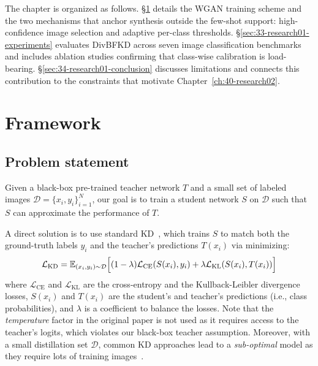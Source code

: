 \documentclass[12pt, a4paper, twoside]{book}
\numberwithin{equation}{chapter}
\theoremstyle{plain}
\theoremstyle{definition}
\theoremstyle{remark}
\newenvironment{foldable}{}{}
\newcommand*{\ie}{i.e.}
\begin{document}
\begin{foldable}
  The chapter is organized as follows.
  \S\ref{sec:32-research01-framework} details the WGAN training scheme and the two mechanisms that anchor synthesis outside the few-shot support: high-confidence image selection and adaptive per-class thresholds.
  \S\ref{sec:33-research01-experiments} evaluates DivBFKD across seven image classification benchmarks and includes ablation studies confirming that class-wise calibration is load-bearing.
  \S\ref{sec:34-research01-conclusion} discusses limitations and connects this contribution to the constraints that motivate Chapter~\ref{ch:40-research02}.
\end{foldable}
 \section{Framework} \label{sec:32-research01-framework}
\subsection{Problem statement}
\begin{foldable}
  Given a black-box pre-trained teacher network $T$ and a small set of labeled images $\mathcal{D}=\{x_{i},y_{i}\}_{i=1}^{N}$, our goal is to train a student network $S$ on $\mathcal{D}$ such that $S$ can approximate the performance of $T$.
\end{foldable}

\begin{foldable}
  A direct solution is to use standard \ac{KD}~\cite{hinton2015distilling}, which trains $S$ to match both the ground-truth labels $y_{i}$ and the teacher's predictions $T(x_{i})$ via minimizing:
  \begin{equation}
    \mathcal{L}_\text{KD} = \mathbb{E}_{(x_{i}, y_{i}) \sim \mathcal{D}} \Bigl[{
        (1 - \lambda) \mathcal{L}_{\text{CE}}(S(x_{i}), y_{i}) +
        \lambda \mathcal{L}_\text{KL}(S(x_{i}), T(x_{i}))
    }\Bigr]
    \label{eq:StandardKD}
  \end{equation}
  where $\mathcal{L}_{\text{CE}}$ and $\mathcal{L}_\text{KL}$ are the cross-entropy and the Kullback-Leibler divergence losses, $S(x_{i})$ and $T(x_{i})$ are the student's and teacher's predictions (\ie, class probabilities), and $\lambda$ is a coefficient to balance the losses.
  Note that the \textit{temperature} factor in the original paper is not used as it requires access to the teacher's logits, which violates our black-box teacher assumption.
  Moreover, with a small distillation set $\mathcal{D}$, common \ac{KD} approaches lead to a \textit{sub-optimal} model as they require lots of training images~\cite{hinton2015distilling,kim2018paraphrasing,ahn2019variational,tian2020contrastive}.
\end{foldable}
\end{document}
